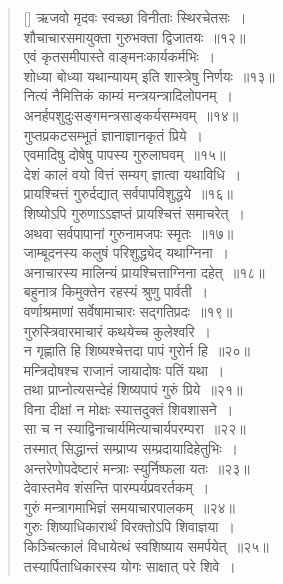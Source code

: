 \documentclass[twoside,12pt,notitlepage]{book}
\begin{document}
\begin{verse}[\versewidth]
ऋजवो मृदवः स्वच्छा विनीताः स्थिरचेतसः~।\\[-6pt]
शौचाचारसमायुक्ता गुरुभक्ता द्विजातयः~॥१२॥\\
एवं कृतसमीपास्ते वाङ्मनःकार्यकर्मभिः~।\\[-6pt]
शोध्या बोध्या यथान्यायम् इति शास्त्रेषु निर्णयः~॥१३॥\\
नित्यं नैमित्तिकं काम्यं मन्त्रयन्त्रादिलोपनम्~।\\[-6pt]
अनर्हपशुदुःसङ्गमन्त्रसाङ्कर्यसम्भवम्~॥१४॥\\
गुप्तप्रकटसम्भूतं ज्ञानाज्ञानकृतं प्रिये~।\\[-6pt]
एवमादिषु दोषेषु पापस्य गुरुलाघवम्~॥१५॥\footA \\
देशं कालं वयो वित्तं सम्यग् ज्ञात्वा यथाविधि~।\\[-6pt]
प्रायश्चित्तं गुरुर्दद्यात् सर्वपापविशुद्धये~॥१६॥\\
शिष्योऽपि गुरुणाऽऽज्ञप्तं प्रायश्चित्तं समाचरेत्~।\\[-6pt]
अथवा सर्वपापानां गुरुनामजपः स्मृतः~॥१७॥\\
जाम्बूदनस्य कलुषं परिशुद्ध्येद् यथाग्निना~।\\[-6pt]
अनाचारस्य मालिन्यं प्रायश्चित्ताग्निना दहेत्~॥१८॥\\
बहुनात्र किमुक्तेन रहस्यं श्रुणु पार्वती~।\\[-6pt]
वर्णाश्रमाणां सर्वेषामाचारः सद्गतिप्रदः~॥१९॥\\
गुरुस्त्रिवारमाचारं कथयेच्च कुलेश्वरि~।\\[-6pt]
न गृह्णाति हि शिष्यश्चेत्तदा पापं गुरोर्न हि~॥२०॥\\
मन्त्रिदोषश्च राजानं जायादोषः पतिं यथा~।\\[-6pt]
तथा प्राप्नोत्यसन्देहं शिष्यपापं गुरुं प्रिये~॥२१॥\\
विना दीक्षां न मोक्षः स्यात्तदुक्तं शिवशासने~।\\[-6pt]
सा च न स्याद्विनाचार्यमित्याचार्यपरम्परा~॥२२॥\\
तस्मात् सिद्धान्तं सम्प्राप्य सम्प्रदायादिहेतुभिः~।\\[-6pt]
अन्तरेणोपदेष्टारं मन्त्राः स्युर्निष्फला यतः~॥२३॥\\
देवास्तमेव शंसन्ति पारम्पर्यप्रवरर्तकम्~।\\[-6pt]
गुरुं मन्त्रागमाभिज्ञं समयाचारपालकम्~॥२४॥\\
गुरुः शिष्याधिकारार्थं विरक्तोऽपि शिवाज्ञया~।\\[-6pt]
किञ्चित्कालं विधायेत्थं स्वशिष्याय समर्पयेत्~॥२५॥\\
तस्यार्पिताधिकारस्य योगः साक्षात् परे शिवे~।\\[-6pt]

\end{verse}
\end{document}
